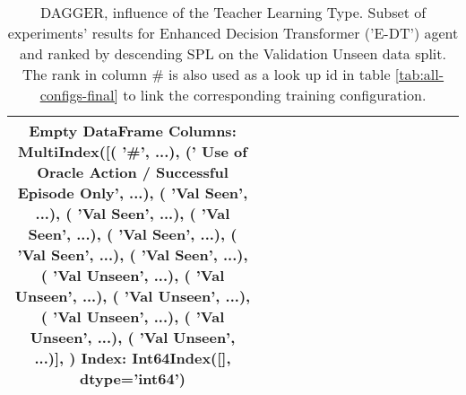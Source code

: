 \begin{table}
\centering
\caption{\label{tab:e_dt_dagger_pe_oa}DAGGER, influence of the Teacher Learning Type. Subset of experiments' results for Enhanced Decision Transformer ('E-DT') agent and ranked by descending SPL on the Validation Unseen data split. The rank in column \# is also used as a look up id in table \ref{tab:all-configs-final} to link the corresponding training configuration.}
\begin{tabular}{@{\hskip3pt}c@{\hskip3pt}c@{\hskip3pt}c@{\hskip3pt}c@{\hskip3pt}c@{\hskip3pt}c@{\hskip3pt}c@{\hskip3pt}c@{\hskip3pt}c@{\hskip3pt}c@{\hskip3pt}c@{\hskip3pt}c@{\hskip3pt}c@{\hskip3pt}c@{\hskip3pt}c}
\toprule
Empty DataFrame
Columns: MultiIndex([(                                             '\textbf{\#}', ...),
            ('\textbf{ Use of Oracle Action / Successful Episode Only}', ...),
            (                                       '\textbf{Val Seen}', ...),
            (                                       '\textbf{Val Seen}', ...),
            (                                       '\textbf{Val Seen}', ...),
            (                                       '\textbf{Val Seen}', ...),
            (                                       '\textbf{Val Seen}', ...),
            (                                       '\textbf{Val Seen}', ...),
            (                                     '\textbf{Val Unseen}', ...),
            (                                     '\textbf{Val Unseen}', ...),
            (                                     '\textbf{Val Unseen}', ...),
            (                                     '\textbf{Val Unseen}', ...),
            (                                     '\textbf{Val Unseen}', ...),
            (                                     '\textbf{Val Unseen}', ...)],
           )
Index: Int64Index([], dtype='int64') \\
\bottomrule
\end{tabular}
\end{table}
